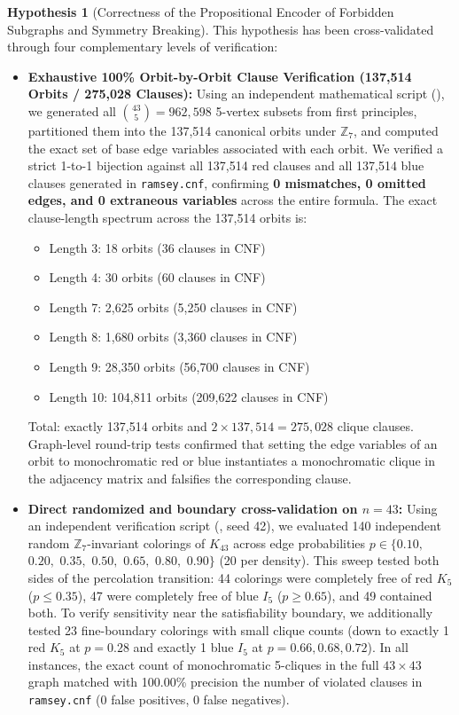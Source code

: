 \documentclass[11pt,a4paper]{article}
\theoremstyle{definition}
\newtheorem{hypothesis}{Hypothesis}
\begin{document}
\begin{hypothesis}[Correctness of the Propositional Encoder of Forbidden Subgraphs and Symmetry Breaking]
This hypothesis has been cross-validated through four complementary levels of verification:
\begin{itemize}
    \item \textbf{Exhaustive 100\% Orbit-by-Orbit Clause Verification (137,514 Orbits / 275,028 Clauses):} Using an independent mathematical script (), we generated all $\binom{43}{5} = 962,598$ 5-vertex subsets from first principles, partitioned them into the 137,514 canonical orbits under $\mathbb{Z}_7$, and computed the exact set of base edge variables associated with each orbit. We verified a strict 1-to-1 bijection against all 137,514 red clauses and all 137,514 blue clauses generated in \texttt{ramsey.cnf}, confirming \textbf{0 mismatches, 0 omitted edges, and 0 extraneous variables} across the entire formula. The exact clause-length spectrum across the 137,514 orbits is:
    \begin{itemize}
        \item Length 3: 18 orbits (36 clauses in CNF)
        \item Length 4: 30 orbits (60 clauses in CNF)
        \item Length 7: 2,625 orbits (5,250 clauses in CNF)
        \item Length 8: 1,680 orbits (3,360 clauses in CNF)
        \item Length 9: 28,350 orbits (56,700 clauses in CNF)
        \item Length 10: 104,811 orbits (209,622 clauses in CNF)
    \end{itemize}
    Total: exactly 137,514 orbits and $2 \times 137,514 = 275,028$ clique clauses. Graph-level round-trip tests confirmed that setting the edge variables of an orbit to monochromatic red or blue instantiates a monochromatic clique in the adjacency matrix and falsifies the corresponding clause.
    \item \textbf{Direct randomized and boundary cross-validation on $n=43$:} Using an independent verification script (, seed 42), we evaluated 140 independent random $\mathbb{Z}_7$-invariant colorings of $K_{43}$ across edge probabilities $p \in \{0.10,$ $0.20,$ $0.35,$ $0.50,$ $0.65,$ $0.80,$ $0.90\}$ (20 per density). This sweep tested both sides of the percolation transition: 44 colorings were completely free of red $K_5$ ($p \le 0.35$), 47 were completely free of blue $I_5$ ($p \ge 0.65$), and 49 contained both. To verify sensitivity near the satisfiability boundary, we additionally tested 23 fine-boundary colorings with small clique counts (down to exactly 1 red $K_5$ at $p=0.28$ and exactly 1 blue $I_5$ at $p=0.66, 0.68, 0.72$). In all instances, the exact count of monochromatic 5-cliques in the full $43 \times 43$ graph matched with 100.00\% precision the number of violated clauses in \texttt{ramsey.cnf} (0 false positives, 0 false negatives).

\end{itemize}
\end{hypothesis}
\end{document}
